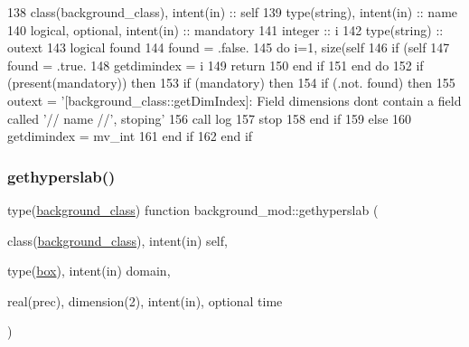 \begin{DoxyCode}
138     \textcolor{keywordtype}{class}(background\_class), \textcolor{keywordtype}{intent(in)} :: self
139     \textcolor{keywordtype}{type}(string), \textcolor{keywordtype}{intent(in)} :: name
140     \textcolor{keywordtype}{logical}, \textcolor{keywordtype}{optional}, \textcolor{keywordtype}{intent(in)} :: mandatory
141     \textcolor{keywordtype}{integer} :: i
142     \textcolor{keywordtype}{type}(string) :: outext
143     \textcolor{keywordtype}{logical} found
144     found = .false.
145     \textcolor{keywordflow}{do} i=1, \textcolor{keyword}{size}(self%
146         \textcolor{keywordflow}{if} (self%
147             found = .true.
148             getdimindex = i
149             \textcolor{keywordflow}{return}
150 \textcolor{keywordflow}{        end if}
151 \textcolor{keywordflow}{    end do}
152     \textcolor{keywordflow}{if} (\textcolor{keyword}{present}(mandatory)) \textcolor{keywordflow}{then}
153         \textcolor{keywordflow}{if} (mandatory) \textcolor{keywordflow}{then}
154             \textcolor{keywordflow}{if} (.not. found) \textcolor{keywordflow}{then}
155                 outext = \textcolor{stringliteral}{'[background\_class::getDimIndex]: Field dimensions dont contain a field called '}//
       name //\textcolor{stringliteral}{', stoping'}
156                 \textcolor{keyword}{call }log%
157                 stop
158 \textcolor{keywordflow}{            end if}
159         \textcolor{keywordflow}{else}
160             getdimindex = mv\_int
161 \textcolor{keywordflow}{        end if}
162 \textcolor{keywordflow}{    end if}
\end{DoxyCode}
\mbox{\label{namespacebackground__mod_ae26fda3baab915148ec5749d1eda2ea6}} 
\subsubsection{\texorpdfstring{gethyperslab()}{gethyperslab()}}
{\footnotesize\ttfamily type(\mbox{\hyperlink{structbackground__mod_1_1background__class}{background\+\_\+class}}) function background\+\_\+mod\+::gethyperslab (\begin{DoxyParamCaption}\item[{class(\mbox{\hyperlink{structbackground__mod_1_1background__class}{background\+\_\+class}}), intent(in)}]{self,  }\item[{type(\mbox{\hyperlink{structgeometry__mod_1_1box}{box}}), intent(in)}]{domain,  }\item[{real(prec), dimension(2), intent(in), optional}]{time }\end{DoxyParamCaption})\hspace{0.3cm}{\ttfamily [private]}}




